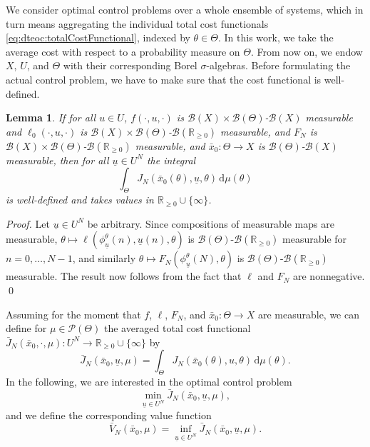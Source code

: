 \documentclass[letterpaper, 10 pt, conference]{IEEEconf}  %
\newcommand{\Rnn}{\mathbb{R}_{\geq 0}} %
\newcommand{\Borel}{\mathcal{B}} %
\newcommand{\Pbs}{\mathcal{P}} %
\newcommand{\diff}{\, \mathrm{d}} %
\newcommand{\s}{\phi} %
\newcommand{\es}{\bar{x}} %
\newcommand{\is}[1]{{\underline{#1}}} %
\theoremstyle{theorem}
\newtheorem{lemma}[theorem]{Lemma}
\theoremstyle{definition}
\theoremstyle{remark}
\begin{document}
We consider optimal control problems over a whole ensemble of systems, which in turn means aggregating the individual total cost functionals \eqref{eq:dteoc:totalCostFunctional}, indexed by $\theta\in\Theta$.
In this work, we take the average cost with respect to a probability measure on $\Theta$.
From now on, we endow $X$, $U$, and $\Theta$ with their corresponding Borel $\sigma$-algebras.
Before formulating the actual control problem, we have to make sure that the cost functional is well-defined.
\begin{lemma} \label{lem:dteoc:ecc:functionalWelldefined}
If for all $u\in U$, $f(\cdot,u,\cdot)$ is $\Borel(X)\times\Borel(\Theta)$-$\Borel(X)$ measurable
and $\ell_0(\cdot,u,\cdot)$ is $\Borel(X)\times\Borel(\Theta)$-$\Borel(\Rnn)$ measurable,
and $F_N$ is $\Borel(X)\times\Borel(\Theta)$-$\Borel(\Rnn)$ measurable,
and $\es_0 \colon \Theta \rightarrow X$ is $\Borel(\Theta)$-$\Borel(X)$ measurable,
then for all $\is{u}\in U^N$ the integral
\begin{equation}
    \int_{\Theta} J_N(\es_0(\theta),\is{u},\theta) \diff \mu(\theta)
\end{equation}
is well-defined and takes values in $\Rnn\cup\{\infty\}$.
\end{lemma}
\begin{proof}
Let $\is{u}\in U^N$ be arbitrary.
Since compositions of measurable maps are measurable, $\theta \mapsto \ell(\s_\is{u}^\theta(n),\is{u}(n),\theta)$ is $\Borel(\Theta)$-$\Borel(\Rnn)$ measurable for $n=0,\ldots,N-1$, and similarly $\theta \mapsto F_N(\s_\is{u}^\theta(N),\theta)$ is $\Borel(\Theta)$-$\Borel(\Rnn)$ measurable.
The result now follows from the fact that $\ell$ and $F_N$ are nonnegative. \qed
\end{proof}
Assuming for the moment that $f$, $\ell$, $F_N$, and $\es_0  \colon \Theta \rightarrow X$ are measurable,
we can define for $\mu\in\Pbs(\Theta)$ the averaged total cost functional $\bar J_N(\es_0,\cdot,\mu) \colon U^N \rightarrow \Rnn \cup \{\infty\}$ by
\begin{equation} \label{eq:dteoc:ecc:averageCostFunctional}
    \bar J_N(\es_0, \is{u}, \mu) = \int_{\Theta} J_N(\es_0(\theta),u,\theta) \diff \mu(\theta).
\end{equation}
In the following, we are interested in the optimal control problem
\begin{equation} \label{eq:dteoc:ecc:OCP}
    \min_{\is{u}\in U^N} \bar J_N(\es_0, \is{u}, \mu),
\end{equation}
and we define the corresponding value function
\begin{equation}
    \bar V_N(\es_0,\mu) = \inf_{\is{u} \in U^N}\bar J_N(\es_0, \is{u}, \mu).
\end{equation}
\end{document}
